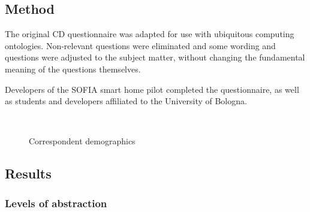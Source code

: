\subsection{Method}

The original \ac{CD} questionnaire \cite{Blackwell2007} was adapted for use with ubiquitous computing ontologies. Non-relevant questions were eliminated and some wording and questions were adjusted to the subject matter, without changing the fundamental meaning of the questions themselves. 

Developers of the \ac{SOFIA} smart home pilot completed the questionnaire, as well as students and developers affiliated to the University of Bologna.

\begin{figure}[bth] 
         \quad
         \\
         \quad
        
        \caption{Correspondent demographics}\label{demographics}
\end{figure}

% 
% 
% 

\subsection{Results}


\subsubsection{Levels of abstraction}

